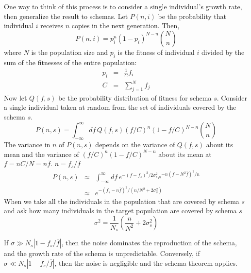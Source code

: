 One way to think of this process is to consider a single individual's
growth rate, then generalize the result to schemas.  Let $P(n,i)$ be
the probability that individual $i$ receives $n$ copies in the next
generation.  Then,
\begin{equation}
P(n,i)=p_i^n (1-p_i)^{N-n} {N \choose n}
\end{equation}
where $N$ is the population size and $p_i$ is the fitness of individual $i$
divided by the sum of the fitnesses of the entire population:
\begin{eqnarray}
p_i&=& \frac{1}{C} f_i \nonumber\\
C&=& \sum_{j=1}^N{f_j}
\end{eqnarray}
Now let $Q(f,s)$ be the probability distribution of fitness for schema $s$.
Consider a single individual taken at random from the set of individuals
covered by the schema $s$.
\begin{equation}
P(n,s)= \int_{-\infty}^{\infty}{
	df\, Q(f,s) (f/C)^n (1-f/C)^{N-n} {N \choose n}
}
\end{equation}
The variance in $n$ of $P(n,s)$ depends on the variance of $Q(f,s)$ about
its mean and the variance of $(f/C)^n (1-f/C)^{N-n}$ about its mean
at $f=n C/N= n \overline{f}$.
$n=f_s/\overline{f}$
\begin{eqnarray}
P(n,s) &\approx& \int_{-\infty}^{\infty}{
	   df\, e^{-(f-f_s)^2/2\sigma_s^2} e^{-n(f-N^2\overline{f})^2/n}}
	\nonumber\\
	&\approx& e^{-(f_s-n \overline{f})^2/(n/N^2 +2 \sigma_s^2)}
\end{eqnarray}
When we take all the individuals in the population that are covered by
schema $s$ and ask how many individuals in the target population are covered
by schema $s$
\begin{equation}
\sigma^2=\frac{1}{N_s}(\frac{n}{N^2}+2 \sigma_s^2)
\end{equation}

If $\sigma \gg N_s |1 - f_s/\overline{f}|$, then the noise dominates the
reproduction of the schema, and the growth rate of the schema is unpredictable.
Conversely, if $\sigma \ll N_s |1 - f_s /\overline{f}|$, then the noise is
negligible and the schema theorem applies.

